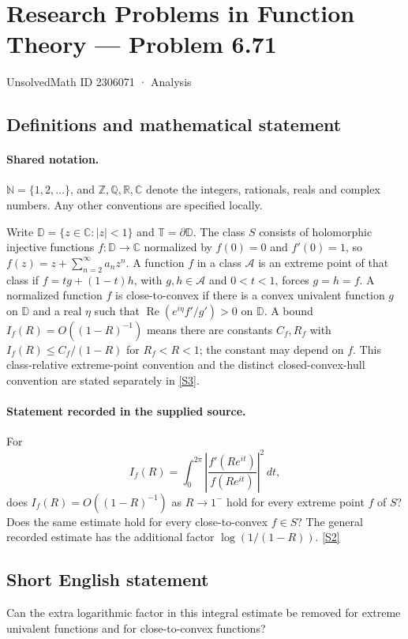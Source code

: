 \documentclass[11pt]{article}
\newcommand{\sref}[2]{\hyperlink{source:#1:#2}{[S#2]}}
\begin{document}
\setcounter{section}{2306070}
\section{Research Problems in Function Theory — Problem 6.71}\label{2306071}
{\small\sffamily UnsolvedMath ID 2306071 · Analysis}
\subsection{Definitions and mathematical statement}

\paragraph{Shared notation.}$\mathbb N=\{1,2,\ldots\}$, and $\mathbb Z,\mathbb Q,\mathbb R,\mathbb C$ denote the integers, rationals, reals and complex numbers. Any other conventions are specified locally.


Write $\mathbb D=\{z\in\mathbb C:|z|<1\}$ and $\mathbb T=\partial\mathbb D$. The class $S$ consists of holomorphic injective functions $f:\mathbb D\to\mathbb C$ normalized by $f(0)=0$ and $f'(0)=1$, so $f(z)=z+\sum_{n=2}^{\infty}a_nz^n$. A function $f$ in a class $\mathcal A$ is an extreme point of that class if $f=tg+(1-t)h$, with $g,h\in\mathcal A$ and $0<t<1$, forces $g=h=f$. A normalized function $f$ is close-to-convex if there is a convex univalent function $g$ on $\mathbb D$ and a real $\eta$ such that $\operatorname{Re}(e^{i\eta}f'/g')>0$ on $\mathbb D$. A bound $I_f(R)=O((1-R)^{-1})$ means there are constants $C_f,R_f$ with $I_f(R)\le C_f/(1-R)$ for $R_f<R<1$; the constant may depend on $f$. This class-relative extreme-point convention and the distinct closed-convex-hull convention are stated separately in \sref{2306071}{3}.
\paragraph{Statement recorded in the supplied source.}
For \[I_f(R)=\int_0^{2\pi}\left|\frac{f'(Re^{it})}{f(Re^{it})}\right|^2\,dt,\] does $I_f(R)=O((1-R)^{-1})$ as $R\to1^-$ hold for every extreme point $f$ of $S$? Does the same estimate hold for every close-to-convex $f\in S$? The general recorded estimate has the additional factor $\log(1/(1-R))$. \sref{2306071}{2}
\subsection{Short English statement}
Can the extra logarithmic factor in this integral estimate be removed for extreme univalent functions and for close-to-convex functions?
\end{document}
